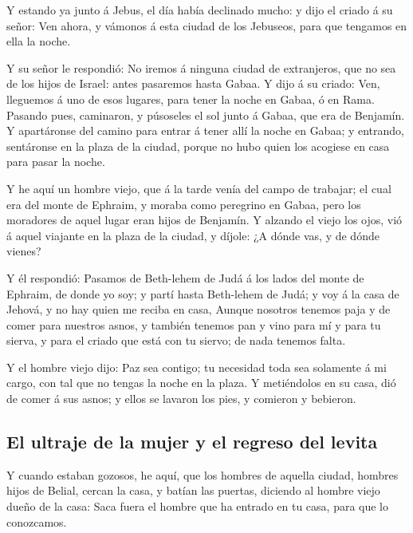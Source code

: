  Y estando ya junto á Jebus, el día había declinado
mucho: y dijo el criado á su señor: Ven ahora, y vámonos á esta ciudad
de los Jebuseos, para que tengamos en ella la noche.

 Y su señor le respondió: No iremos á ninguna ciudad de
extranjeros, que no sea de los hijos de Israel: antes pasaremos hasta
Gabaa. Y dijo á su criado:  Ven, lleguemos á uno de esos
lugares, para tener la noche en Gabaa, ó en Rama. 
Pasando pues, caminaron, y púsoseles el sol junto á Gabaa, que era de
Benjamín.  Y apartáronse del camino para entrar á tener
allí la noche en Gabaa; y entrando, sentáronse en la plaza de la ciudad,
porque no hubo quien los acogiese en casa para pasar la noche.

 Y he aquí un hombre viejo, que á la tarde venía del
campo de trabajar; el cual era del monte de Ephraim, y moraba como
peregrino en Gabaa, pero los moradores de aquel lugar eran hijos de
Benjamín.  Y alzando el viejo los ojos, vió á aquel
viajante en la plaza de la ciudad, y díjole: ¿A dónde vas, y de dónde
vienes?

 Y él respondió: Pasamos de Beth-lehem de Judá á los
lados del monte de Ephraim, de donde yo soy; y partí hasta Beth-lehem de
Judá; y voy á la casa de Jehová, y no hay quien me reciba en casa,
 Aunque nosotros tenemos paja y de comer para nuestros
asnos, y también tenemos pan y vino para mí y para tu sierva, y para el
criado que está con tu siervo; de nada tenemos falta.

 Y el hombre viejo dijo: Paz sea contigo; tu necesidad
toda sea solamente á mi cargo, con tal que no tengas la noche en la
plaza.  Y metiéndolos en su casa, dió de comer á sus
asnos; y ellos se lavaron los pies, y comieron y bebieron.

\hypertarget{el-ultraje-de-la-mujer-y-el-regreso-del-levita}{%
\subsection{El ultraje de la mujer y el regreso del
levita}\label{el-ultraje-de-la-mujer-y-el-regreso-del-levita}}

 Y cuando estaban gozosos, he aquí, que los hombres de
aquella ciudad, hombres hijos de Belial, cercan la casa, y batían las
puertas, diciendo al hombre viejo dueño de la casa: Saca fuera el hombre
que ha entrado en tu casa, para que lo conozcamos.

